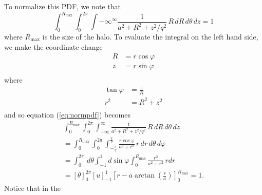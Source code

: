 To normalize this PDF, we note that
\begin{equation}
\int_0^{R_{\mathrm{max}}}\int_0^{2\pi}\int{-\infty}^{\infty} \frac{1}{a^2 + R^2 + z^2/q^2}\,R\, dR\, d\theta\, dz = 1
\label{eq:normpdf}
\end{equation}
where $R_{\mathrm{max}}$ is the size of the halo.  To evaluate the integral on
the left hand side, we make the coordinate change
\begin{equation}
\begin{split}
R &= r \cos \varphi \\
z &= r \sin \varphi \\
\end{split}
\end{equation}
where
\begin{equation}
\begin{split}
\tan \varphi &= \frac{z}{R} \\
r^2 &= R^2 + z^2 \\
\end{split}
\end{equation}
and so equation (\ref{eq:normpdf}) becomes
\begin{multline}
\int_0^{R_\mathrm{max}}\int_0^{2\pi}\int_{-\infty}^{\infty} \frac{1}{a^2 + R^2 + z^2/q^2}\,R\, dR\, d\theta\, dz \\
= \int_0^{R_{\mathrm{max}}}\int_0^{2\pi}\int_{-\frac{\pi}{2}}^{\frac{\pi}{2}} \frac{r\cos\varphi}{a^2+r^2}\,r\, dr \, d\theta\, d\varphi \\
= \int_0^{2\pi}\, d\theta 
\int_{-1}^{1} d\sin\varphi \int_0^{R_{\mathrm{max}}} \frac{r^2}{a^2+r^2}\,r dr \\
= \left[\theta\right]_0^{2\pi} \left[u\right]_{-1}^1 \left[r -
a\arctan\left(\frac{r}{a}\right)\right]_0^{R_{\mathrm{max}}} = 1.
\end{multline}
Notice that in the 






